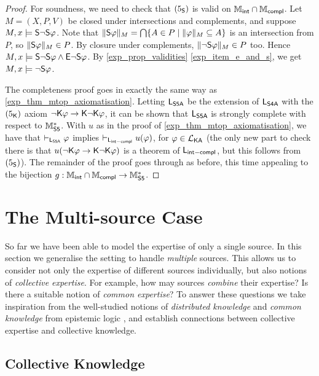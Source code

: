 \begin{proof}
    For soundness, we need to check that $\fivesoundness$ is valid on
    $\Mint \cap \Mcompl$. Let $M = (X, P, V)$ be closed under intersections and
    complements, and suppose $M, x \models \S\neg\S\phi$. Note that
    $\|\S\phi\|_M = \bigcap\{A \in P \mid \|\phi\|_M \subseteq A\}$ is an
    intersection from $P$, so $\|\S\phi\|_M \in P$. By closure under
    complements, $\|\neg\S\phi\|_M \in P$ too. Hence $M, x \models \S\neg\S\phi
    \land \E\neg\S\phi$. By \cref{exp_prop_validities} \cref{exp_item_e_and_s},
    we get $M, x \models \neg\S\phi$.

    The completeness proof goes in exactly the same way as
    \cref{exp_thm_mtop_axiomatisation}. Letting $\sLsfivea$ be the extension of
    $\sLsfoura$ with the $\fivek$ axiom $\neg\K\phi \limplies \K\neg\K\phi$, it
    can be shown that $\sLsfivea$ is strongly complete with respect to
    $\Msfive$.  With $u$ as in the proof of \cref{exp_thm_mtop_axiomatisation}, we
    have that $\entails_{\sLsfivea} \phi$ implies $\entails_{\sLintcompl}
    u(\phi)$, for $\phi \in \cLKA$ (the only new part to check there is that
    $u(\neg\K\phi \limplies \K\neg\K\phi)$ is a theorem of $\sLintcompl$, but
    this follows from $\fivesoundness$). The remainder of the proof goes
    through as before, this time appealing to the bijection $g: \Mint \cap
    \Mcompl \to \Msfive$.
\end{proof}

\section{The Multi-source Case}
\label{exp_sec_multisource}

So far we have been able to model the expertise of only a single
source. In this section we generalise the setting to handle \emph{multiple}
sources. This allows us to consider not only the expertise of different
sources individually, but also notions of \emph{collective expertise}. For
example, how may sources \emph{combine} their expertise? Is there a suitable
notion of
\emph{common expertise}? To answer these questions we take inspiration from the
well-studied notions of \emph{distributed knowledge} and \emph{common
knowledge} from epistemic logic \cite{fagin2003reasoning}, and
establish connections between collective expertise and collective knowledge.

\subsection{Collective Knowledge}

